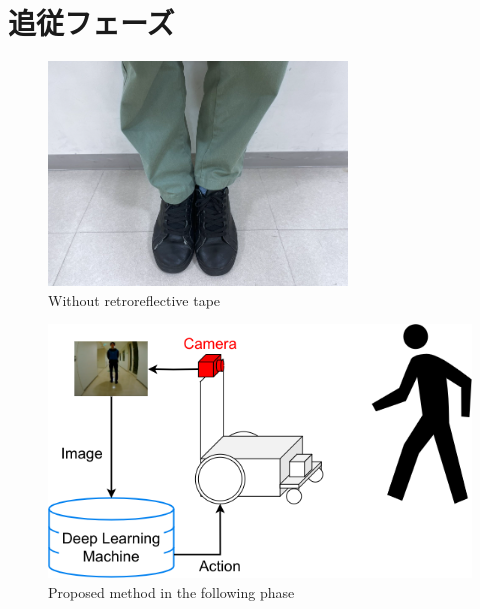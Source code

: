 
\section{追従フェーズ}

\begin{figure}[h]
  \centering
  \includegraphics[keepaspectratio, scale=0.7] {images/RobotGuidance_following_phase_leg.png}
  \captionsetup{justification=raggedright} %
  \caption{Without retroreflective tape}
  \label{Fig:RobotGuidance_following_phase_leg}
\end{figure}

\begin{figure}[h]
  \centering
  \includegraphics[keepaspectratio, scale=0.60] {images/RobotGuidance_following_system.png}
  \captionsetup{justification=raggedright} %
  \caption{Proposed method in the following phase}
  \label{Fig:RobotGuidance_following_system}
\end{figure}

\newpage
